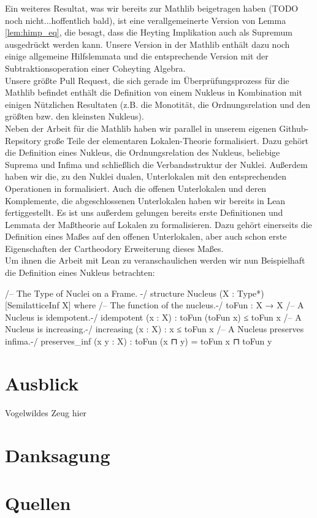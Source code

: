 \documentclass{article}
\begin{document}
Ein weiteres Resultat, was wir bereits zur Mathlib beigetragen haben (TODO noch nicht...hoffentlich bald), ist eine verallgemeinerte Version von Lemma \ref{lem:himp_eq}, die besagt, dass die Heyting Implikation auch als Supremum ausgedrückt werden kann. Unsere Version in der Mathlib enthält dazu noch einige allgemeine Hilfslemmata und die entsprechende Version mit der Subtraktionsoperation einer Coheyting Algebra. \\ %
Unsere größte Pull Request, die sich gerade im Überprüfungsprozess für die Mathlib befindet enthält die Definition von einem Nukleus in Kombination mit einigen Nützlichen Resultaten (z.B. die Monotität, die Ordnungsrelation und den größten bzw. den kleinsten Nukleus).\\ %
Neben der Arbeit für die Mathlib haben wir parallel in unserem eigenen Github-Repsitory große Teile der elementaren Lokalen-Theorie formalisiert. Dazu gehört die Definition eines Nukleus, die Ordnungsrelation des Nukleus, beliebige Suprema und Infima und schließlich die Verbandsstruktur der Nuklei. Außerdem haben wir die, zu den Nuklei dualen, Unterlokalen mit den entsprechenden Operationen in formalisiert. Auch die offenen Unterlokalen und deren Komplemente, die abgeschlossenen Unterlokalen haben wir bereits in Lean fertiggestellt. Es ist uns außerdem gelungen bereits erste Definitionen und Lemmata der Maßtheorie auf Lokalen zu formalisieren. Dazu gehört einerseits die Definition eines Maßes auf den offenen Unterlokalen, aber auch schon erste Eigenschaften der Cartheodory Erweiterung dieses Maßes. \\
Um ihnen die Arbeit mit Lean zu veranschaulichen werden wir nun Beispielhaft die Definition eines Nukleus betrachten:
\begin{leancode}
    /--
The Type of Nuclei on a Frame.
-/
structure Nucleus (X : Type*) [SemilatticeInf X] where
  /-- The function of the nucleus.-/
  toFun : X → X
  /-- A Nucleus is idempotent.-/
  idempotent (x : X) : toFun (toFun x) ≤ toFun x
  /-- A Nucleus is increasing.-/
  increasing (x : X) : x ≤ toFun x
  /-- A Nucleus preserves infima.-/
  preserves_inf (x y : X) : toFun (x ⊓ y) = toFun x ⊓ toFun y
\end{leancode}




\section{Ausblick}
Vogelwildes Zeug hier



\section{Danksagung}
\section{Quellen}
\printbibliography
\end{document}
